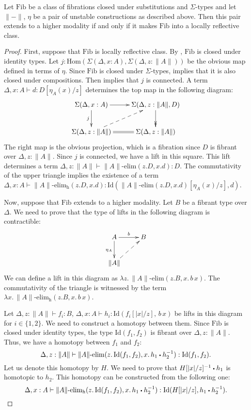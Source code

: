 \documentclass[reqno]{amsart}
\theoremstyle{definition}
\theoremstyle{remark}
\newcommand{\fs}[1]{\mathrm{#1}}
\newcommand{\Hom}{\fs{Hom}}
\newcommand{\Id}{\fs{Id}}
\newcommand{\sym}[1]{#1^{-1}}
\newcommand{\Fib}{\fs{Fib}}
\numberwithin{figure}{section}
\newcommand{\ct}{%
  \mathchoice{\mathbin{\raisebox{0.25ex}{$\displaystyle\centerdot$}}}%
             {\mathbin{\raisebox{0.25ex}{$\centerdot$}}}%
             {\mathbin{\raisebox{0.25ex}{$\scriptstyle\,\centerdot\,$}}}%
             {\mathbin{\raisebox{0.25ex}{$\scriptscriptstyle\,\centerdot\,$}}}
}
\begin{document}
\begin{prop}
Let $\Fib$ be a class of fibrations closed under substitutions and $\Sigma$-types and let $\| - \|$, $\eta$ be a pair of unstable constructions as described above.
Then this pair extends to a higher modality if and only if it makes $\Fib$ into a locally reflective class.
\end{prop}
\begin{proof}
First, suppose that $\Fib$ is locally reflective class.
By , $\Fib$ is closed under identity types.
Let $j : \Hom(\Sigma(\Delta, x : A), \Sigma(\Delta, z : \| A \|))$ be the obvious map defined in terms of $\eta$.
Since $\Fib$ is closed under $\Sigma$-types,  implies that it is also closed under compositions.
Then  implies that $j$ is connected.
A term $\Delta, x : A \vdash d : D[\eta_A(x)/z]$ determines the top map in the following diagram:
\[ \xymatrix{ \Sigma(\Delta, x : A) \ar[r] \ar[d]_j                  & \Sigma(\Delta, z : \| A \|, D) \ar@{->>}[d] \\
              \Sigma(\Delta, z : \| A \|) \ar@{-->}[ur] \ar@{=}[r]  & \Sigma(\Delta, z : \| A \|)
            } \]
The right map is the obvious projection, which is a fibration since $D$ is fibrant over $\Delta, z : \| A \|$.
Since $j$ is connected, we have a lift in this square.
This lift determines a term $\Delta, z : \| A \| \vdash \| A \|\text{-}\fs{elim}(z.D, x.d) : D$.
The commutativity of the upper triangle implies the existence of a term $\Delta, x : A \vdash \| A \|\text{-}\fs{elim_h}(z.D, x.d) : \Id(\| A \|\text{-}\fs{elim}(z.D, x.d)[\eta_A(x)/z],d)$.

Now, suppose that $\Fib$ extends to a higher modality.
Let $B$ be a fibrant type over $\Delta$.
We need to prove that the type of lifts in the following diagram is contractible:
\[ \xymatrix{ A \ar[r]^b \ar[d]_{\eta_A} & B \\
              \| A \| \ar@{-->}[ur]
            } \]
We can define a lift in this diagram as $\lambda z.\,\| A \|\text{-}\fs{elim}(z.B, x.\,b\,x)$.
The commutativity of the triangle is witnessed by the term $\lambda x.\,\| A \|\text{-}\fs{elim_h}(z.B, x.\,b\,x)$.

Let $\Delta, z : \| A \| \vdash f_i : B$, $\Delta, x : A \vdash h_i : \Id(f_i[|x|/z],\,b\,x)$ be lifts in this diagram for $i \in \{1,2\}$.
We need to construct a homotopy between them.
Since $\Fib$ is closed under identity types, the type $\Id(f_1,f_2)$ is fibrant over $\Delta, z : \| A \|$.
Thus, we have a homotopy between $f_1$ and $f_2$:
\[ \Delta, z : \| A \| \vdash \| A \|\text{-}\fs{elim}(z.\,\Id(f_1,f_2), x.\,h_1 \ct \sym{h_2}) : \Id(f_1, f_2). \]
Let us denote this homotopy by $H$.
We need to prove that $\sym{H[|x|/z]} \ct h_1$ is homotopic to $h_2$.
This homotopy can be constructed from the following one:
\[ \Delta, x : A \vdash \| A \|\text{-}\fs{elim_h}(z.\,\Id(f_1,f_2), x.\,h_1 \ct \sym{h_2}) : \Id(H[|x|/z], h_1 \ct \sym{h_2}). \]
\end{proof}
\end{document}
